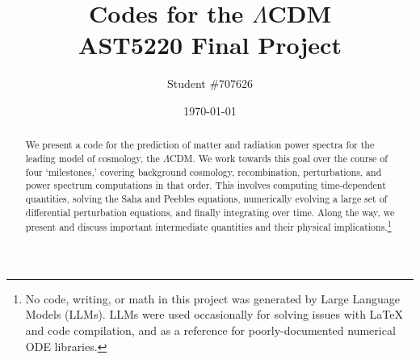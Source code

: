 \documentclass[aps,prl,twocolumn,groupedaddress,nofootinbib]{revtex4-2}
\begin{document}

\title{Codes for the $\Lambda$CDM \\ \normalsize AST5220 Final Project}


\author{Student \#707626}


\date{\today}

\begin{abstract}
    We present a code for the prediction of matter and radiation power spectra for the leading model of cosmology, the $\Lambda$CDM. We work towards this goal over the course of four `milestones,' covering background cosmology, recombination, perturbations, and power spectrum computations in that order. This involves computing time-dependent quantities, solving the Saha and Peebles equations, numerically evolving a large set of differential perturbation equations, and finally integrating over time. Along the way, we present and discuss important intermediate quantities and their physical implications.\footnote{No code, writing, or math in this project was generated by Large Language Models (LLMs). LLMs were used occasionally for solving issues with LaTeX and code compilation, and as a reference for poorly-documented numerical ODE libraries.}
\end{abstract}
\end{document}
